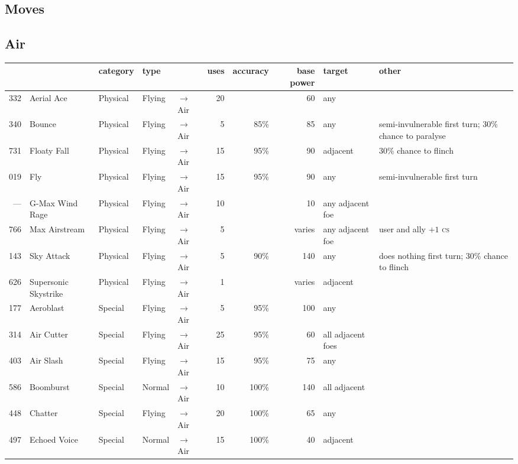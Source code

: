 \documentclass{article}
\newcommand{\cs}{\textsc{cs}}
\begin{document}
\begin{landscape}
\clearpage
\normalsize
\section{Moves}

\subsection{Air}
\small
\begin{longtable}{rl|l|ll|rrr|l|l}
 &  & category & type &  & uses & accuracy & base power & target & other \\
\hline
332 & Aerial Ace & Physical & Flying & $\rightarrow$ Air & 20 &  & 60 & any &  \\
340 & Bounce & Physical & Flying & $\rightarrow$ Air & 5 & 85\% & 85 & any & semi-invulnerable first turn; 30\% chance to paralyse \\
731 & Floaty Fall & Physical & Flying & $\rightarrow$ Air & 15 & 95\% & 90 & adjacent & 30\% chance to flinch \\
019 & Fly & Physical & Flying & $\rightarrow$ Air & 15 & 95\% & 90 & any & semi-invulnerable first turn \\
--- & G-Max Wind Rage & Physical & Flying & $\rightarrow$ Air & 10 &  & 10 & any adjacent foe &  \\
766 & Max Airstream & Physical & Flying & $\rightarrow$ Air & 5 &  & varies & any adjacent foe & user and ally $+1$ \cs \\
143 & Sky Attack & Physical & Flying & $\rightarrow$ Air & 5 & 90\% & 140 & any & does nothing first turn; 30\% chance to flinch \\
626 & Supersonic Skystrike & Physical & Flying & $\rightarrow$ Air & 1 &  & varies & adjacent &  \\
\hline
177 & Aeroblast & Special & Flying & $\rightarrow$ Air & 5 & 95\% & 100 & any &  \\ %
314 & Air Cutter & Special & Flying & $\rightarrow$ Air & 25 & 95\% & 60 & all adjacent foes &  \\
403 & Air Slash & Special & Flying & $\rightarrow$ Air & 15 & 95\% & 75 & any &  \\
586 & Boomburst & Special & Normal & $\rightarrow$ Air & 10 & 100\% & 140 & all adjacent &  \\
448 & Chatter & Special & Flying & $\rightarrow$ Air & 20 & 100\% & 65 & any &  \\
497 & Echoed Voice & Special & Normal & $\rightarrow$ Air & 15 & 100\% & 40 & adjacent &  \\

\end{longtable}
\end{landscape}
\end{document}
